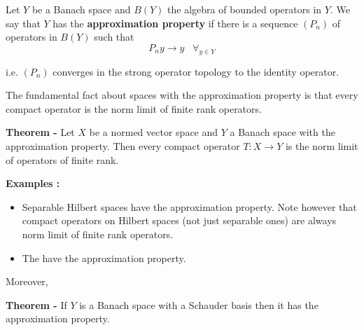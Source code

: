 \documentclass[12pt]{article}
\begin{document}
Let $Y$ be a Banach space and $B(Y)$ the algebra of bounded operators in $Y$. We say that $Y$ has the {\bf approximation property} if there is a sequence $(P_n)$ of  operators in $B(Y)$ such that 
\begin{displaymath}
P_n y \longrightarrow y \;\;\; \forall_{y \in Y}
\end{displaymath}

i.e. $(P_n)$ converges in the strong operator topology to the identity operator.

The fundamental fact about spaces with the approximation property is that every compact operator is the norm limit of finite rank operators.

{\bf Theorem -} Let $X$ be a normed vector space and $Y$ a Banach space with the approximation property. Then every compact operator $T: X \longrightarrow Y$ is the norm limit of operators of finite rank.

{\bf Examples :}
\begin{itemize}
\item Separable Hilbert spaces have the approximation property. Note however that compact operators on Hilbert spaces (not just separable ones) are always norm limit of finite rank operators.
\item The  have the approximation property.
\end{itemize}

Moreover,

{\bf Theorem -} If $Y$ is a Banach space with a Schauder basis then it has the approximation property.
\end{document}
